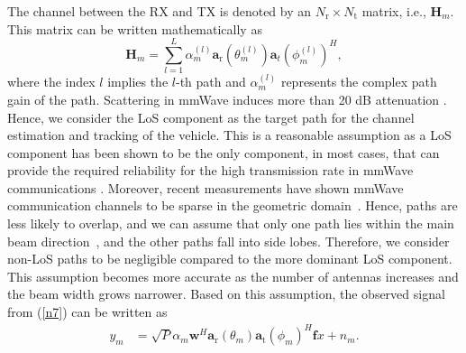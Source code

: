 \documentclass{ieeeaccess}
\begin{document}
The channel between the RX and TX is denoted by an $N_\textrm{r} \times N_\textrm{t}$ matrix, i.e., $\boldsymbol{H}_m$. This matrix can be written mathematically as~\cite{RH,rh_track,c2}
\begin{equation} \label{n8}
\boldsymbol{H}_m = \sum\limits_{l=1}^{L}\alpha_m^{(l)}\boldsymbol{a}_\textrm{r}(\theta_{m}^{(l)})\boldsymbol{a}_t(\phi_m^{(l)})^H,
\end{equation}
where the index $l$ implies the $l$-th path and $\alpha_m^{(l)}$ represents the complex path gain of the path. Scattering in mmWave induces more than 20 dB attenuation \cite{r11}. Hence, we consider the LoS component as the target path for the channel estimation and tracking of the vehicle. This is a reasonable assumption as a LoS component has been shown to be the only component, in most cases, that can provide the required reliability for the high transmission rate in mmWave communications \cite{r11,r12}. Moreover, recent measurements have shown mmWave communication channels to be sparse in the geometric domain~\cite{p1}. Hence, paths are less likely to overlap, and we can assume that only one path lies within the main beam direction~\cite{rh_track}, and the other paths fall into side lobes. Therefore, we consider non-LoS paths to be negligible compared to the more dominant LoS component. This assumption becomes more accurate as the number of antennas increases and the beam width grows narrower. Based on this assumption, the observed signal from (\ref{n7}) can be written as
\begin{equation} \label{n9}
\begin{split}
y_m &= \sqrt{P}\alpha_m\boldsymbol{w}^H\boldsymbol{a}_\textrm{r}(\theta_m)\boldsymbol{a}_\textrm{t}(\phi_m)^H\boldsymbol{f}x + n_m.\\
\end{split}
\end{equation}
\end{document}
